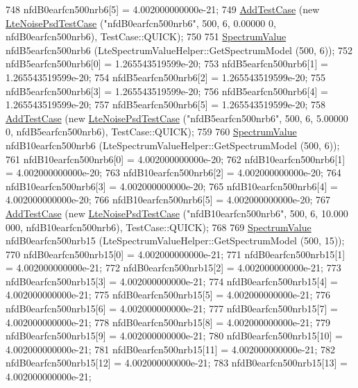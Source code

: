 \begin{DoxyCode}
748   nfdB0earfcn500nrb6[5] = 4.002000000000e-21;
749   \hyperlink{classns3_1_1TestCase_a3718088e3eefd5d6454569d2e0ddd835}{AddTestCase} (\textcolor{keyword}{new} \hyperlink{classLteNoisePsdTestCase}{LteNoisePsdTestCase} (\textcolor{stringliteral}{"nfdB0earfcn500nrb6"}, 500, 6, 0.00000
      0, nfdB0earfcn500nrb6), TestCase::QUICK);
750 
751   \hyperlink{classns3_1_1SpectrumValue}{SpectrumValue} nfdB5earfcn500nrb6 (LteSpectrumValueHelper::GetSpectrumModel (500, 6));
752   nfdB5earfcn500nrb6[0] = 1.265543519599e-20;
753   nfdB5earfcn500nrb6[1] = 1.265543519599e-20;
754   nfdB5earfcn500nrb6[2] = 1.265543519599e-20;
755   nfdB5earfcn500nrb6[3] = 1.265543519599e-20;
756   nfdB5earfcn500nrb6[4] = 1.265543519599e-20;
757   nfdB5earfcn500nrb6[5] = 1.265543519599e-20;
758   \hyperlink{classns3_1_1TestCase_a3718088e3eefd5d6454569d2e0ddd835}{AddTestCase} (\textcolor{keyword}{new} \hyperlink{classLteNoisePsdTestCase}{LteNoisePsdTestCase} (\textcolor{stringliteral}{"nfdB5earfcn500nrb6"}, 500, 6, 5.00000
      0, nfdB5earfcn500nrb6), TestCase::QUICK);
759 
760   \hyperlink{classns3_1_1SpectrumValue}{SpectrumValue} nfdB10earfcn500nrb6 (LteSpectrumValueHelper::GetSpectrumModel (500, 6));
761   nfdB10earfcn500nrb6[0] = 4.002000000000e-20;
762   nfdB10earfcn500nrb6[1] = 4.002000000000e-20;
763   nfdB10earfcn500nrb6[2] = 4.002000000000e-20;
764   nfdB10earfcn500nrb6[3] = 4.002000000000e-20;
765   nfdB10earfcn500nrb6[4] = 4.002000000000e-20;
766   nfdB10earfcn500nrb6[5] = 4.002000000000e-20;
767   \hyperlink{classns3_1_1TestCase_a3718088e3eefd5d6454569d2e0ddd835}{AddTestCase} (\textcolor{keyword}{new} \hyperlink{classLteNoisePsdTestCase}{LteNoisePsdTestCase} (\textcolor{stringliteral}{"nfdB10earfcn500nrb6"}, 500, 6, 10.000
      000, nfdB10earfcn500nrb6), TestCase::QUICK);
768 
769   \hyperlink{classns3_1_1SpectrumValue}{SpectrumValue} nfdB0earfcn500nrb15 (LteSpectrumValueHelper::GetSpectrumModel (500, 15));
770   nfdB0earfcn500nrb15[0] = 4.002000000000e-21;
771   nfdB0earfcn500nrb15[1] = 4.002000000000e-21;
772   nfdB0earfcn500nrb15[2] = 4.002000000000e-21;
773   nfdB0earfcn500nrb15[3] = 4.002000000000e-21;
774   nfdB0earfcn500nrb15[4] = 4.002000000000e-21;
775   nfdB0earfcn500nrb15[5] = 4.002000000000e-21;
776   nfdB0earfcn500nrb15[6] = 4.002000000000e-21;
777   nfdB0earfcn500nrb15[7] = 4.002000000000e-21;
778   nfdB0earfcn500nrb15[8] = 4.002000000000e-21;
779   nfdB0earfcn500nrb15[9] = 4.002000000000e-21;
780   nfdB0earfcn500nrb15[10] = 4.002000000000e-21;
781   nfdB0earfcn500nrb15[11] = 4.002000000000e-21;
782   nfdB0earfcn500nrb15[12] = 4.002000000000e-21;
783   nfdB0earfcn500nrb15[13] = 4.002000000000e-21;

\end{DoxyCode}
